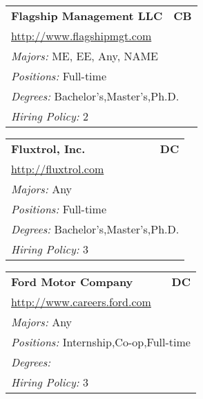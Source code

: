 \documentclass[twoside]{article}
\begin{document}
\begin{center}
\begin{multicols}{3}
\begin{FlushLeft}
\begin{minipage}{.9\columnwidth}
\end{minipage}
 
\begin{minipage}{.9\columnwidth}\begin{tabularx}{.95\columnwidth}{Xr}
                 {\Large\bf Flagship Management LLC} & {\Large\bf CB}\\
    \multicolumn{2}{p{.95\columnwidth}}{\url{http://www.flagshipmgt.com}}\\
    \multicolumn{2}{p{.95\columnwidth}}{\emph{Majors:} ME, EE, Any, NAME}\\
    \multicolumn{2}{p{.95\columnwidth}}{\emph{Positions:} Full-time}\\
    \multicolumn{2}{p{.95\columnwidth}}{\emph{Degrees:} Bachelor's,Master's,Ph.D.}\\
    \multicolumn{2}{p{.95\columnwidth}}{\emph{Hiring Policy:} 2}\\
    \end{tabularx}
    
\end{minipage}
 
\begin{minipage}{.9\columnwidth}\begin{tabularx}{.95\columnwidth}{Xr}
                 {\Large\bf Fluxtrol, Inc.} & {\Large\bf DC}\\
    \multicolumn{2}{p{.95\columnwidth}}{\url{http://fluxtrol.com}}\\
    \multicolumn{2}{p{.95\columnwidth}}{\emph{Majors:} Any}\\
    \multicolumn{2}{p{.95\columnwidth}}{\emph{Positions:} Full-time}\\
    \multicolumn{2}{p{.95\columnwidth}}{\emph{Degrees:} Bachelor's,Master's,Ph.D.}\\
    \multicolumn{2}{p{.95\columnwidth}}{\emph{Hiring Policy:} 3}\\
    \end{tabularx}
    
\end{minipage}
 
\begin{minipage}{.9\columnwidth}\begin{tabularx}{.95\columnwidth}{Xr}
                 {\Large\bf Ford Motor Company} & {\Large\bf DC}\\
    \multicolumn{2}{p{.95\columnwidth}}{\url{http://www.careers.ford.com}}\\
    \multicolumn{2}{p{.95\columnwidth}}{\emph{Majors:} Any}\\
    \multicolumn{2}{p{.95\columnwidth}}{\emph{Positions:} Internship,Co-op,Full-time}\\
    \multicolumn{2}{p{.95\columnwidth}}{\emph{Degrees:} }\\
    \multicolumn{2}{p{.95\columnwidth}}{\emph{Hiring Policy:} 3}\\
    \end{tabularx}
    

\end{minipage}
\end{FlushLeft}
\end{multicols}
\end{center}
\end{document}
